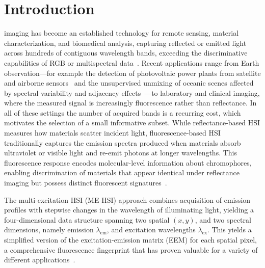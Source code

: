 \section{Introduction}
\label{sec:introduction}

 imaging has become an established technology for remote sensing, material characterization, and biomedical analysis, capturing reflected or emitted light across hundreds of contiguous wavelength bands, exceeding the discriminative capabilities of RGB or multispectral data~\cite{plaza2009recent,bioucas2013hyperspectral,hong2024spectralgpt,tran2026medical}.
Recent applications range from Earth observation---for example the detection of photovoltaic power plants from satellite and airborne sensors~\cite{joerges2023photovoltaic} and the unsupervised unmixing of oceanic scenes affected by spectral variability and adjacency effects~\cite{deville2023oceanic}---to laboratory and clinical imaging, where the measured signal is increasingly fluorescence rather than reflectance.
In all of these settings the number of acquired bands is a recurring cost, which motivates the selection of a small informative subset.
While reflectance-based HSI measures how materials scatter
incident light, fluorescence-based HSI traditionally captures the emission spectra produced when materials absorb ultraviolet or visible light and re-emit photons at longer wavelengths.
This fluorescence response encodes molecular-level information about chromophores, enabling discrimination of materials that appear identical under reflectance imaging but possess distinct fluorescent signatures~\cite{muselimyan2016,gil2017}.

The multi-excitation HSI (ME-HSI) approach combines
acquisition of emission profiles with stepwise changes in the
wavelength of illuminating light, yielding a four-dimensional data structure spanning two spatial $(x, y)$, and two spectral dimensions, namely emission $\lambda_{\text{em}}$, and excitation wavelengths $\lambda_{\text{ex}}$.
This yields a simplified version of the excitation-emission matrix (EEM) for each spatial pixel, a comprehensive fluorescence fingerprint that has proven valuable for a variety of different applications~\cite{lakowicz2006principles,swift2018}.

